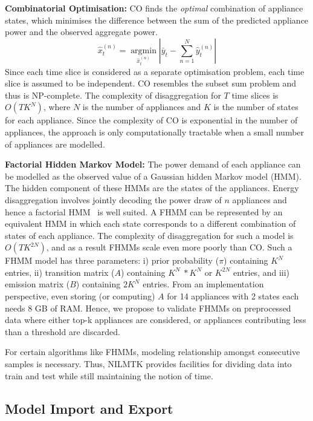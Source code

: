 \documentclass{sig-alternate}
\newcommand{\bluecolor}[1]{\textcolor{blue}{#1}}
\begin{document}
\textbf{Combinatorial Optimisation:}
CO finds the \textit{optimal} combination of appliance states, which minimises the difference between the sum of the predicted appliance power and the observed aggregate power. 
\begin{equation}
\hat{x}^{(n)}_t=\operatorname*{arg min}_{\hat{x}^{(n)}_t}\left|\bar{y}_t-\sum\limits_{n=1}^{N}\hat{y}^{(n)}_t\right|
\end{equation}
Since each time slice is considered as a separate optimisation problem, each time slice is assumed to be independent.
CO resembles the subset sum problem and thus is NP-complete. The complexity of disaggregation for $T$ time slices is $O(TK^N)$, where $N$ is the number of appliances and $K$ is the number of states for each appliance. Since the complexity of CO is exponential in the number of appliances, the approach is only computationally tractable when a small number of appliances are modelled.

\textbf{Factorial Hidden Markov Model:} The power demand of each appliance can be modelled as the observed value of a Gaussian hidden Markov model (HMM). The hidden component of these HMMs are the states of the appliances. Energy disaggregation involves jointly decoding the power draw of $n$ appliances and hence a factorial HMM~\cite{fhmm} is well suited. A FHMM can be represented by an equivalent HMM in which each state corresponds to a different combination of states of each appliance. The complexity of disaggregation for such a model is $O(TK^{2N})$, and as a result FHMMs scale even more poorly than CO. Such a FHMM model has three parameters: i) prior probability ($\pi$) containing $K^N$ entries, ii) transition matrix ($A$) containing $K^N~*K^N$ or $K^{2N}$ entries, and iii) emission matrix ($B$) containing $2K^N$ entries. From an implementation perspective, even storing (or computing) $A$ for 14 appliances with 2 states each needs 8 GB of RAM. Hence, we propose to validate FHMMs on preprocessed data where either top-k appliances are considered, or appliances contributing less than a threshold are discarded.

For certain algorithms like FHMMs, modeling relationship amongst consecutive samples is necessary. Thus, NILMTK provides facilities for dividing data into train and test while still maintaining the notion of time.
\subsection{Model Import and Export}
\end{document}
